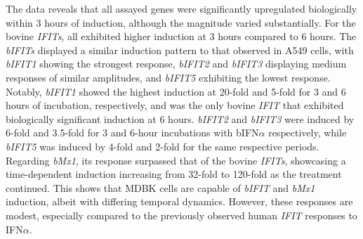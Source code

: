 The data reveals that all assayed genes were significantly upregulated biologically within 3 hours of induction, although the magnitude varied substantially. For the bovine \textit{IFITs}, all exhibited higher induction at 3 hours compared to 6 hours. The \textit{bIFITs} displayed a similar induction pattern to that observed in A549 cells, with \textit{bIFIT1} showing the strongest response, \textit{bIFIT2} and \textit{bIFIT3} displaying medium responses of similar amplitudes, and \textit{bIFIT5} exhibiting the lowest response. Notably, \textit{bIFIT1} showed the highest induction at 20-fold and 5-fold for 3 and 6 hours of incubation, respectively, and was the only bovine \textit{IFIT} that exhibited biologically significant induction at 6 hours. \textit{bIFIT2} and \textit{bIFIT3} were induced by 6-fold and 3.5-fold for 3 and 6-hour incubations with bIFN\(\alpha\) respectively, while \textit{bIFIT5} was induced by 4-fold and 2-fold for the same respective periods. Regarding \textit{bMx1}, its response surpassed that of the bovine \textit{IFITs}, showcasing a time-dependent induction increasing from 32-fold to 120-fold as the treatment continued. This shows that MDBK cells are capable of \textit{bIFIT} and \textit{bMx1} induction, albeit with differing temporal dynamics. However, these responses are modest, especially compared to the previously observed human \textit{IFIT} responses to IFN\(\alpha\).

